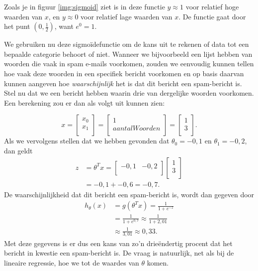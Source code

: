 Zoals je in figuur \ref{img:sigmoid} ziet is in deze functie $y\approx1$ voor relatief hoge waarden van $x$, en $y\approx0$ voor relatief lage waarden van $x$. De functie gaat door het punt $(0,\frac{1}{2})$, want $e^0=1$. 

We gebruiken nu deze sigmoïdefunctie om de kans uit te rekenen of data tot een bepaalde categorie behoort of niet. Wanneer we bijvoorbeeld een lijst hebben van woorden die vaak in spam e-mails voorkomen, zouden we eenvoudig kunnen tellen hoe vaak deze woorden in een specifiek bericht voorkomen en op basis daarvan kunnen aangeven hoe \textit{waarschijnlijk} het is dat dit bericht een spam-bericht is. Stel nu dat we een bericht hebben waarin drie van dergelijke woorden voorkomen. Een berekening zou er dan als volgt uit kunnen zien:

%
\[
x = \begin{bmatrix}
x_0\\
x_1\\
\end{bmatrix}
= \begin{bmatrix}
1\\
aantalWoorden\\
\end{bmatrix}
= \begin{bmatrix}
1\\
3\\
\end{bmatrix}.
\]
%
Als we vervolgens stellen dat we hebben gevonden dat $\theta_0=-0,1$ en $\theta_1=-0,2$, dan geldt 
%
\[
\begin{aligned}
z &= \theta^Tx
= \begin{bmatrix}
-0,1 & -0,2\\
\end{bmatrix}
\begin{bmatrix}
1\\
3\\
\end{bmatrix} \\
&= -0,1 + -0,6 = -0,7.
\end{aligned}
\]
%
De waarschijnlijkheid dat dit bericht een spam-bericht is, wordt dan gegeven door 
%
\[
\begin{aligned}
h_\theta(x) &= g(\theta^Tx) = \frac{1}{1+e^{-z}}\\
&= \frac{1}{1+e^{0,7}}
\approx \frac{1}{1+2,01} \\
&\approx \frac{1}{3,01} \approx 0,33.
\end{aligned}
\]
%
Met deze gegevens is er dus een kans van zo'n drieëndertig procent dat het bericht in kwestie een spam-bericht is. De vraag is natuurlijk, net als bij de lineaire regressie, hoe we tot de waardes van $\theta$ komen.


